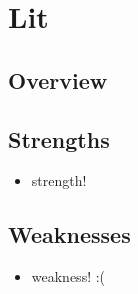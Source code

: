 
\section{Lit}
\label{sec:lit}

\subsection{Overview}
\label{subsec:lit:overview}

\subsection{Strengths}
\label{subsec:lit:strengths}
\begin{itemize}
    \item strength! 
\end{itemize}

\subsection{Weaknesses}
\label{subsec:lit:weaknesses}
\begin{itemize}
    \item weakness! :( 
\end{itemize}
